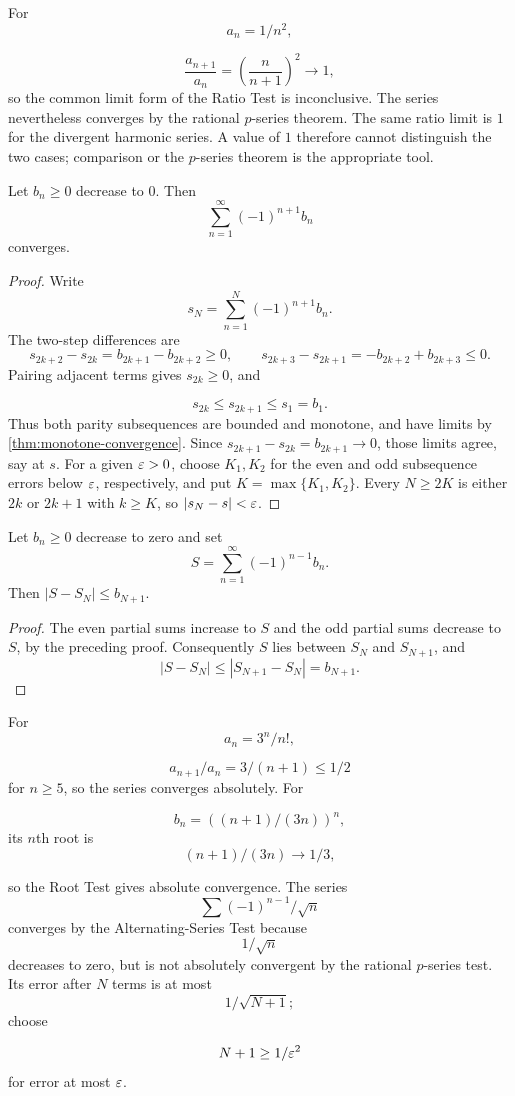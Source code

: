 \begin{example}
For
\[
a_n=1/n^2,
\]

\[
\frac{a_{n+1}}{a_n}=\left(\frac{n}{n+1}\right)^2\longrightarrow1,
\]
so the common limit form of the Ratio Test is inconclusive.  The series
nevertheless converges by the rational $p$-series theorem.  The same ratio
limit is $1$ for the divergent harmonic series.  A value of $1$ therefore
cannot distinguish the two cases; comparison or the $p$-series theorem is
the appropriate tool.
\end{example}

\begin{theorem}
\label{thm:alternating-test}
Let $b_n\geq0$ decrease to $0$. Then
\[
\sum_{n=1}^{\infty}(-1)^{n+1}b_n
\]
converges.
\end{theorem}
\begin{proof}
Write
\[
s_N=\sum_{n=1}^N(-1)^{n+1}b_n.
\]
 The two-step differences are
\[
s_{2k+2}-s_{2k}=b_{2k+1}-b_{2k+2}\geq0,
\qquad s_{2k+3}-s_{2k+1}=-b_{2k+2}+b_{2k+3}\leq0.
\]
Pairing adjacent terms gives $s_{2k}\geq0$, and

\[
s_{2k}\leq s_{2k+1}\leq s_1=b_1.
\]
 Thus both parity subsequences
are bounded and monotone, and have limits by \cref{thm:monotone-convergence}.
Since $s_{2k+1}-s_{2k}=b_{2k+1}\to0$, those limits agree, say at $s$.
For a given $\varepsilon>0$, choose $K_1,K_2$ for the even and odd subsequence errors below $\varepsilon$,
respectively, and put $K=\max\{K_1,K_2\}$. Every $N\geq2K$ is either
$2k$ or $2k+1$ with $k\geq K$, so $|s_N-s|<\varepsilon$.
\end{proof}
\begin{proposition}
\label{prop:alternating-remainder}
Let $b_n\geq0$ decrease to zero and set
\[
S=\sum_{n=1}^\infty(-1)^{n-1}b_n.
\]
Then $|S-S_N|\leq b_{N+1}$.
\end{proposition}
\begin{proof}
The even partial sums increase to $S$ and the odd partial sums decrease
to $S$, by the preceding proof. Consequently $S$ lies between $S_N$
and $S_{N+1}$, and
\[
|S-S_N|\leq|S_{N+1}-S_N|=b_{N+1}.
\]
\end{proof}


\begin{example}
For
\[
a_n=3^n/n!,
\]

\[
a_{n+1}/a_n=3/(n+1)\leq1/2
\]
 for $n\geq5$,
so the series converges absolutely. For

\[
b_n=((n+1)/(3n))^n,
\]
 its $n$th root is
\[
(n+1)/(3n)\to1/3,
\]

so the Root Test gives absolute convergence.
The series
\[
\sum(-1)^{n-1}/\sqrt n
\]
 converges by the
Alternating-Series Test because
\[
1/\sqrt n
\]
 decreases to zero,
but is not absolutely convergent by the rational $p$-series test.
Its error after $N$ terms is at most
\[
1/\sqrt{N+1};
\]
 choose

\[
N+1\geq1/\varepsilon^2
\]
 for error at most $\varepsilon$.
\end{example}

